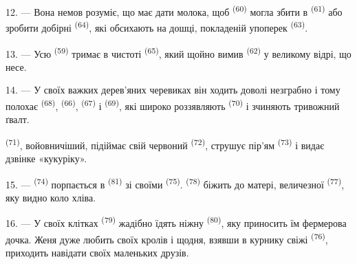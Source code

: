 12. --- Вона немов розуміє, що має дати молока, щоб 
\textsuperscript{(60)} могла збити  в 
\textsuperscript{(61)} або зробити добірні  \textsuperscript{(64)},
які обсихають на дошці, покладеній упоперек 
\textsuperscript{(63)}.

13. --- Усю  \textsuperscript{(59)} тримає в чистоті
 \textsuperscript{(65)}, який щойно вимив 
\textsuperscript{(62)} у великому відрі, що несе.

\VUsaut{3.0mm}
\VUsaut{3.0mm}

14. --- У своїх важких дерев'яних черевиках він ходить доволі незграбно і тому
полохає  \textsuperscript{(68)}, 
\textsuperscript{(66)},  \textsuperscript{(67)} і 
\textsuperscript{(69)}, які широко роззявляють 
\textsuperscript{(70)} і зчиняють тривожний ґвалт.

 \textsuperscript{(71)}, войовничіший, підіймає свій червоний
 \textsuperscript{(72)}, струшує пір'ям 
\textsuperscript{(73)} і видає дзвінке «кукуріку».

15. ---  \textsuperscript{(74)} порпається в 
\textsuperscript{(81)} зі своїми  \textsuperscript{(75)}.
 \textsuperscript{(78)} біжить до матері, величезної
 \textsuperscript{(77)}, яку видно коло хліва.

16. --- У своїх клітках  \textsuperscript{(79)} жадібно їдять ніжну
 \textsuperscript{(80)}, яку приносить їм фермерова дочка. Женя
дуже любить своїх кролів і щодня, взявши в курнику свіжі 
\textsuperscript{(76)}, приходить навідати своїх маленьких друзів.
\VUsaut{6.0mm}
\VUfilet{22mm}
